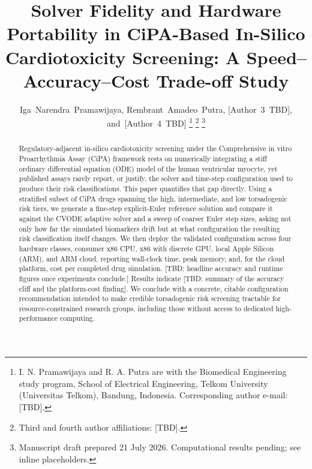 \documentclass[journal]{IEEEtran}
\begin{document}
\title{Solver Fidelity and Hardware Portability in CiPA-Based In-Silico\\
Cardiotoxicity Screening: A Speed--Accuracy--Cost Trade-off Study}

\author{Iga~Narendra~Pramawijaya,
        Rembrant~Amadeo~Putra,
        [Author~3~TBD],
        and~[Author~4~TBD]
\thanks{I. N. Pramawijaya and R. A. Putra are with the Biomedical Engineering study program, School of Electrical Engineering, Telkom University (Universitas Telkom), Bandung, Indonesia. Corresponding author e-mail: [TBD].}
\thanks{Third and fourth author affiliations: [TBD].}
\thanks{Manuscript draft prepared 21 July 2026. Computational results pending; see inline placeholders.}}



\maketitle

\begin{abstract}
Regulatory-adjacent in-silico cardiotoxicity screening under the Comprehensive in vitro Proarrhythmia Assay (CiPA) framework rests on numerically integrating a stiff ordinary differential equation (ODE) model of the human ventricular myocyte, yet published assays rarely report, or justify, the solver and time-step configuration used to produce their risk classifications. This paper quantifies that gap directly. Using a stratified subset of CiPA drugs spanning the high, intermediate, and low torsadogenic risk tiers, we generate a fine-step explicit-Euler reference solution and compare it against the CVODE adaptive solver and a sweep of coarser Euler step sizes, asking not only how far the simulated biomarkers drift but at what configuration the resulting risk classification itself changes. We then deploy the validated configuration across four hardware classes, consumer x86 CPU, x86 with discrete GPU, local Apple Silicon (ARM), and ARM cloud, reporting wall-clock time, peak memory, and, for the cloud platform, cost per completed drug simulation. [TBD: headline accuracy and runtime figures once experiments conclude.] Results indicate [TBD: summary of the accuracy cliff and the platform-cost finding]. We conclude with a concrete, citable configuration recommendation intended to make credible torsadogenic risk screening tractable for resource-constrained research groups, including those without access to dedicated high-performance computing.
\end{abstract}
\end{document}
